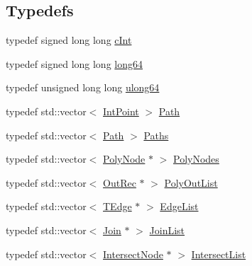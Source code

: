 \subsection*{Typedefs}
\begin{DoxyCompactItemize}
\item 
typedef signed long long \mbox{\hyperlink{namespace_clipper_lib_a7156730a24951629192d4831334bafaa}{c\+Int}}
\item 
typedef signed long long \mbox{\hyperlink{namespace_clipper_lib_a7fd564bf34d174b6c96e07d01e5e7a0a}{long64}}
\item 
typedef unsigned long long \mbox{\hyperlink{namespace_clipper_lib_a031fec5e97eb7e08708f1cafa53a232d}{ulong64}}
\item 
typedef std\+::vector$<$ \mbox{\hyperlink{struct_clipper_lib_1_1_int_point}{Int\+Point}} $>$ \mbox{\hyperlink{namespace_clipper_lib_af39c8fe00f278f18cc8142fef41242da}{Path}}
\item 
typedef std\+::vector$<$ \mbox{\hyperlink{namespace_clipper_lib_af39c8fe00f278f18cc8142fef41242da}{Path}} $>$ \mbox{\hyperlink{namespace_clipper_lib_a4bab1d9e10805fa6f1fd3b78c56efcfe}{Paths}}
\item 
typedef std\+::vector$<$ \mbox{\hyperlink{class_clipper_lib_1_1_poly_node}{Poly\+Node}} $\ast$ $>$ \mbox{\hyperlink{namespace_clipper_lib_ac9381bbff6b966df41b78667385b9c1e}{Poly\+Nodes}}
\item 
typedef std\+::vector$<$ \mbox{\hyperlink{struct_clipper_lib_1_1_out_rec}{Out\+Rec}} $\ast$ $>$ \mbox{\hyperlink{namespace_clipper_lib_a955330d96f532e139adb1e52a82fcd43}{Poly\+Out\+List}}
\item 
typedef std\+::vector$<$ \mbox{\hyperlink{struct_clipper_lib_1_1_t_edge}{T\+Edge}} $\ast$ $>$ \mbox{\hyperlink{namespace_clipper_lib_a86ece3ad074061d6b3d18819b1fa4ed7}{Edge\+List}}
\item 
typedef std\+::vector$<$ \mbox{\hyperlink{struct_clipper_lib_1_1_join}{Join}} $\ast$ $>$ \mbox{\hyperlink{namespace_clipper_lib_a7e09990d21008cefa4e28e9056c654c4}{Join\+List}}
\item 
typedef std\+::vector$<$ \mbox{\hyperlink{struct_clipper_lib_1_1_intersect_node}{Intersect\+Node}} $\ast$ $>$ \mbox{\hyperlink{namespace_clipper_lib_aa619079161cda3de8197456767f54396}{Intersect\+List}}
\end{DoxyCompactItemize}
